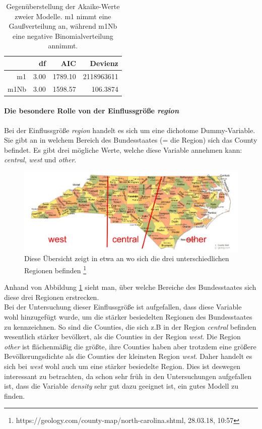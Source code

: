 \begin{table}[ht]
\centering
\begin{tabular}{rrrr}
  \hline
 	   & df & AIC & Devienz\\ 
  \hline
	m1 & 3.00 & 1789.10 & 2118963611\\ 
  m1Nb & 3.00 & 1598.57 & 106.3874\\ 
   \hline
\end{tabular}
\caption{Gegen\"uberstellung der Akaike-Werte zweier Modelle. m1 nimmt eine Gau\ss{}verteilung an, w\"ahrend m1Nb eine negative Binomialverteilung annimmt.}
\label{tab:agn}
\end{table}


\label{sec:preg}
\paragraph{Die besondere Rolle von der Einflussgr\"o\ss{}e \textit{region}}
Bei der Einflussgr\"o\ss{}e \textit{region} handelt es sich um eine dichotome Dummy-Variable.
Sie gibt an in welchem Bereich des Bundesstaates (= die Region) sich das County befindet.
Es gibt drei m\"ogliche Werte, welche diese Variable annehmen kann: \textit{central}, \textit{west} und \textit{other}.

\begin{figure}
\centering
\includegraphics[scale=0.7, keepaspectratio,width=\textwidth,height=\textheight]{./jpgs/ncc.jpg}
\caption{Diese \"Ubersicht zeigt in etwa an wo sich die drei unterschiedlichen Regionen befinden
\footnote{https://geology.com/county-map/north-carolina.shtml, 28.03.18, 10:57} }
\label{fig:ncc}
\end{figure}

Anhand von Abbildung \ref{fig:ncc} sieht man, \"uber welche Bereiche des Bundesstaates sich diese drei Regionen erstrecken. \\
Bei der Untersuchung dieser Einflussgr\"o\ss{}e ist aufgefallen, dass diese Variable wohl hinzugef\"ugt wurde, um die st\"arker besiedelten Regionen des Bundesstaates zu kennzeichnen.
So sind die Counties, die sich z.B in der Region \textit{central} befinden wesentlich st\"arker bev\"olkert, als die Counties in der Region \textit{west}.
Die Region \textit{other} ist fl\"achenm\"a\ss{}ig die gr\"o\ss{}te, ihre Counties haben aber trotzdem eine gr\"o\ss{}ere Bev\"olkerungsdichte als die Counties der kleinsten Region \textit{west}.
Daher handelt es sich bei \textit{west} wohl auch um eine st\"arker besiedelte Region.
Dies ist deswegen interessant zu betrachten, da schon sehr fr\"uh in den Untersuchungen aufgefallen ist, dass die Variable \textit{density} sehr gut dazu geeignet ist, ein gutes Modell zu finden.

